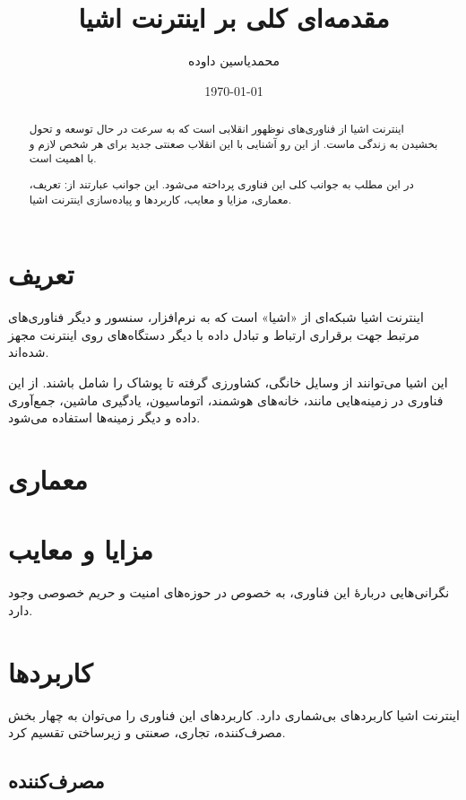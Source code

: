 \documentclass[a4paper, margin=1in]{article}
\author{محمدیاسین داوده}
\title{مقدمه‌ای کلی بر اینترنت اشیا}
\date{\today}
\begin{document}
\begin{titlingpage}
\maketitle

\begin{abstract}
  اینترنت اشیا از فناوری‌های نوظهور انقلابی است که به سرعت در حال توسعه و تحول بخشیدن به زندگی ماست.
  از این رو آشنایی با این انقلاب صعنتی جدید برای هر شخص لازم و با اهمیت است.

  در این مطلب به جوانب کلی این فناوری پرداخته می‌شود. این جوانب عبارتند از: تعریف، معماری، مزایا و معایب، کاربردها و پیاده‌سازی اینترنت اشیا.
\end{abstract}

\tableofcontents
\end{titlingpage}

\section{تعریف}
اینترنت اشیا شبکه‌ای از «اشیا» است که به نرم‌افزار، سنسور و دیگر فناوری‌های
مرتبط جهت برقراری ارتباط و تبادل داده با دیگر دستگاه‌های روی اینترنت مجهز شده‌اند.

این اشیا می‌توانند از وسایل خانگی، کشاورزی گرفته تا پوشاک را شامل باشند. از این فناوری در زمینه‌هایی مانند، خانه‌های هوشمند، اتوماسیون، یادگیری ماشین، جمع‌آوری داده و دیگر زمینه‌ها استفاده می‌شود.

\section{معماری}

\section{مزایا و معایب}

نگرانی‌هایی دربارهٔ این فناوری، به خصوص در حوزه‌های امنیت و حریم خصوصی وجود دارد.

\section{کاربردها}
اینترنت اشیا کاربردهای بی‌شماری دارد.
کاربردهای این فناوری را می‌توان به چهار بخش مصرف‌کننده، تجاری، صعنتی و زیرساختی تقسیم کرد.

\subsection{مصرف‌کننده}
\end{document}
